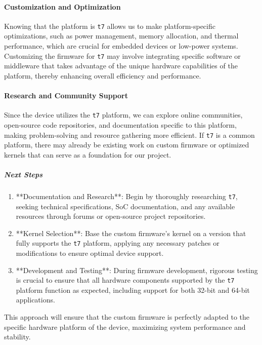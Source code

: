 \paragraph{Customization and Optimization}
Knowing that the platform is \texttt{t7} allows us to make platform-specific optimizations, such as power management, memory allocation, and thermal performance, which are crucial for embedded devices or low-power systems. Customizing the firmware for \texttt{t7} may involve integrating specific software or middleware that takes advantage of the unique hardware capabilities of the platform, thereby enhancing overall efficiency and performance.

\paragraph{Research and Community Support}
Since the device utilizes the \texttt{t7} platform, we can explore online communities, open-source code repositories, and documentation specific to this platform, making problem-solving and resource gathering more efficient. If \texttt{t7} is a common platform, there may already be existing work on custom firmware or optimized kernels that can serve as a foundation for our project.

\subparagraph{Next Steps}
\begin{enumerate}
  \item **Documentation and Research**: Begin by thoroughly researching \texttt{t7}, seeking technical specifications, \gls{SoC} documentation, and any available resources through forums or open-source project repositories.
  \item **Kernel Selection**: Base the custom firmware's kernel on a version that fully supports the \texttt{t7} platform, applying any necessary patches or modifications to ensure optimal device support.
  \item **Development and Testing**: During firmware development, rigorous testing is crucial to ensure that all hardware components supported by the \texttt{t7} platform function as expected, including support for both 32-bit and 64-bit applications.
\end{enumerate}

This approach will ensure that the custom firmware is perfectly adapted to the specific hardware platform of the device, maximizing system performance and stability.


